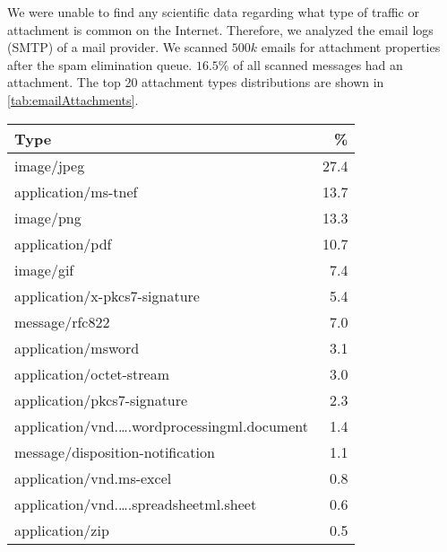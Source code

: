 We were unable to find any scientific data regarding what type of traffic or attachment is common on the Internet. Therefore, we analyzed the email logs (SMTP) of a mail provider. We scanned $500k$ emails for attachment properties after the spam elimination queue. $16.5\%$ of all scanned messages had an attachment. The top 20 attachment types distributions are shown in \cref{tab:emailAttachments}.
\begin{table}[ht]
	
	\begin{tabular}{l|r}\hline
		Type                                                                        & \%\\\hline
		image/jpeg                                                                  &    27.4\\
		application/ms-tnef                                                         &    13.7\\
		image/png                                                                   &    13.3\\
		application/pdf                                                             &    10.7\\
		image/gif                                                                   &    7.4\\
		application/x-pkcs7-signature                                               &    5.4\\
		message/rfc822                                                              &    7.0\\
		application/msword                                                          &    3.1\\
		application/octet-stream                                                    &    3.0\\
		application/pkcs7-signature                                                 &    2.3\\
		application/vnd.\ldots.wordprocessingml.document                            &    1.4\\
		message/disposition-notification                                            &    1.1\\
		application/vnd.ms-excel                                                    &    0.8\\
		application/vnd.\ldots.spreadsheetml.sheet                                  &    0.6\\
		application/zip                                                             &    0.5\\

\end{tabular}
\end{table}
